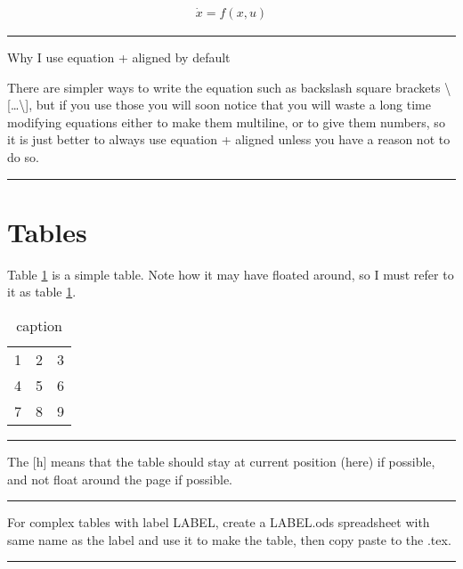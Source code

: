 \documentclass[12pt]{article}
\newcommand{\inOut}[1]{#1} %
\begin{document}
\begin{example} \label{expFor1}
  \inOut{
    \begin{equation}\begin{aligned}\label{eqFor1}
      \dot{x} = f(x,u)
    \end{aligned}\end{equation}
  }
\end{example}\hrule

\begin{remark}\label{remFor1} Why I use equation + aligned by default

  There are simpler ways to write the equation such as backslash square brackets \textbackslash{}[\ldots\textbackslash{}],
  but if you use those you will soon notice that you will waste a long time modifying equations
  either to make them multiline, or to give them numbers, so it is just better to always use
  equation + aligned unless you have a reason not to do so.
\end{remark}\hrule

\section{Tables}\label{secTab}

\begin{example} \label{expTab1}
	Table \ref{tab1} is a simple table. Note how it may have floated around, so I must refer to it as table \ref{tab1}.
	\inOut{
		\begin{table}[h]
		  \centering
		  \begin{tabular}{ccc}
		    1 & 2 & 3 \\
		    4 & 5 & 6 \\
		    7 & 8 & 9 \\
		  \end{tabular}
		  \caption{caption}
		  \label{tab1}
		\end{table}
	}
\end{example}\hrule

\begin{remark} \label{remTab1}
  The [h] means that the table should stay at current position (here) if possible, and not float around the page if possible.
\end{remark}\hrule

\begin{remark} \label{remTab2}
  For complex tables with label LABEL, create a LABEL.ods spreadsheet with same name as the label and use it to make the table, then copy paste to the .tex.
\end{remark}\hrule
\end{document}
